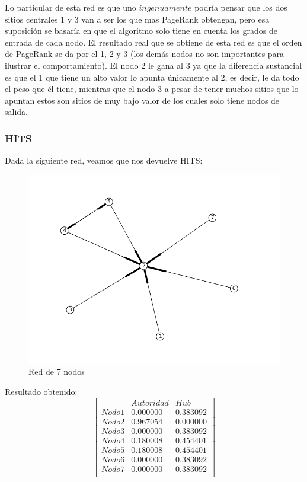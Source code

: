Lo particular de esta red es que uno $ingenuamente$ podría pensar que los dos sitios centrales 1 y 3 van a ser los que mas PageRank obtengan, pero esa suposición se basaría en que el algoritmo solo tiene en cuenta los grados de entrada de cada nodo. 
El resultado real que se obtiene de esta red es que el orden de PageRank se da por el 1, 2 y 3 (los demás nodos no son importantes para ilustrar el comportamiento). El nodo 2 le gana al 3 ya que la diferencia sustancial es que el 1 que tiene un alto valor lo apunta únicamente al 2, es decir, le da todo el peso que él tiene, mientras que el nodo 3 a pesar de tener muchos sitios que lo apuntan estos son sitios de muy bajo valor de los cuales solo tiene nodos de salida.

\subsubsection{HITS}

Dada la siguiente red, veamos que nos devuelve HITS:

 \begin{figure}[!htb]
\begin{center}
    \includegraphics[scale=0.5]{imagenes/test4.png}
    \caption{Red de 7 nodos}
    \end{center}
\end{figure}

Resultado obtenido:
   $$ 
\begin{bmatrix}
              &    Autoridad  &  Hub \\
 Nodo 1 &   0.000000    &      0.383092       \\
 Nodo 2   &  0.967054    &  0.000000     \\
 Nodo 3   &  0.000000   &     0.383092  \\
 Nodo 4   &  0.180008    &     0.454401       \\
 Nodo 5   &  0.180008    &     0.454401        \\
 Nodo 6   &  0.000000    &      0.383092     \\
 Nodo 7   &  0.000000   &     0.383092 \\
\end{bmatrix} 
$$

